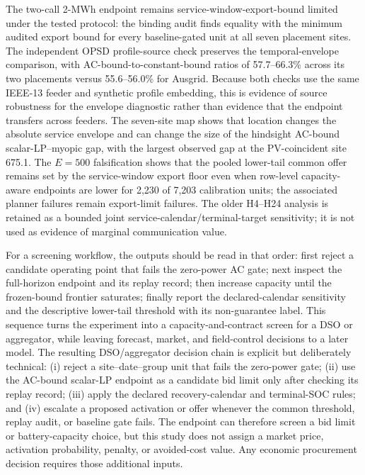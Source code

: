 \documentclass[11pt]{article}
\begin{document}
The two-call 2-MWh endpoint remains service-window-export-bound limited under the tested protocol: the binding audit finds equality with the minimum audited export bound for every baseline-gated unit at all seven placement sites. The independent OPSD profile-source check preserves the temporal-envelope comparison, with AC-bound-to-constant-bound ratios of 57.7--66.3\% across its two placements versus 55.6--56.0\% for Ausgrid. Because both checks use the same IEEE-13 feeder and synthetic profile embedding, this is evidence of source robustness for the envelope diagnostic rather than evidence that the endpoint transfers across feeders. The seven-site map shows that location changes the absolute service envelope and can change the size of the hindsight AC-bound scalar-LP--myopic gap, with the largest observed gap at the PV-coincident site 675.1. The \(E=500\) falsification shows that the pooled lower-tail common offer remains set by the service-window export floor even when row-level capacity-aware endpoints are lower for 2,230 of 7,203 calibration units; the associated planner failures remain export-limit failures. The older H4--H24 analysis is retained as a bounded joint service-calendar/terminal-target sensitivity; it is not used as evidence of marginal communication value.

For a screening workflow, the outputs should be read in that order: first reject a candidate operating point that fails the zero-power AC gate; next inspect the full-horizon endpoint and its replay record; then increase capacity until the frozen-bound frontier saturates; finally report the declared-calendar sensitivity and the descriptive lower-tail threshold with its non-guarantee label. This sequence turns the experiment into a capacity-and-contract screen for a DSO or aggregator, while leaving forecast, market, and field-control decisions to a later model.
The resulting DSO/aggregator decision chain is explicit but deliberately technical: (i) reject a site--date--group unit that fails the zero-power gate; (ii) use the AC-bound scalar-LP endpoint as a candidate bid limit only after checking its replay record; (iii) apply the declared recovery-calendar and terminal-SOC rules; and (iv) escalate a proposed activation or offer whenever the common threshold, replay audit, or baseline gate fails. The endpoint can therefore screen a bid limit or battery-capacity choice, but this study does not assign a market price, activation probability, penalty, or avoided-cost value. Any economic procurement decision requires those additional inputs.
\end{document}
